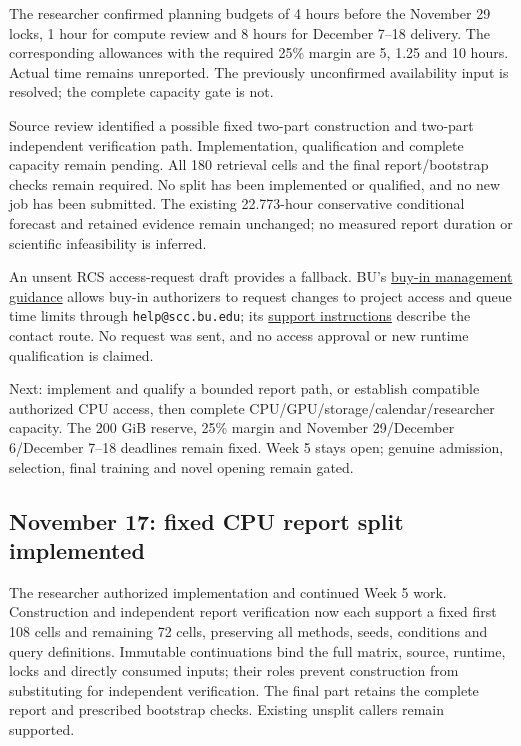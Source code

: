 The researcher confirmed planning budgets of 4 hours before the November 29
locks, 1 hour for compute review and 8 hours for December 7--18 delivery.
The corresponding allowances with the required 25\% margin are 5, 1.25 and
10 hours. Actual time remains unreported. The previously unconfirmed availability
input is resolved; the complete capacity gate is not.

Source review identified a possible fixed two-part construction and two-part
independent verification path. Implementation, qualification and complete
capacity remain pending. All 180 retrieval cells and the final report/bootstrap
checks remain required. No split has been implemented or qualified, and no new
job has been submitted. The existing 22.773-hour conservative conditional
forecast and retained evidence remain unchanged; no measured report duration
or scientific infeasibility is inferred.

An unsent RCS access-request draft provides a fallback. BU's
\href{https://www.bu.edu/tech/support/research/account-management/buy-in-management/}{buy-in management guidance}
allows buy-in authorizers to request changes to project access and queue time
limits through \texttt{help@scc.bu.edu}; its
\href{https://www.bu.edu/tech/support/research/system-usage/support-request/}{support instructions}
describe the contact route. No request was sent, and no access approval or new
runtime qualification is claimed.

Next: implement and qualify a bounded report path, or establish compatible
authorized CPU access, then complete CPU/GPU/storage/calendar/researcher
capacity. The 200 GiB reserve, 25\% margin and November 29/December 6/December
7--18 deadlines remain fixed. Week 5 stays open; genuine admission, selection,
final training and novel opening remain gated.

\subsection*{November 17: fixed CPU report split implemented}

The researcher authorized implementation and continued Week 5 work. Construction
and independent report verification now each support a fixed first 108 cells
and remaining 72 cells, preserving all methods, seeds, conditions and query
definitions. Immutable continuations bind the full matrix, source, runtime,
locks and directly consumed inputs; their roles prevent construction from
substituting for independent verification. The final part retains the complete
report and prescribed bootstrap checks. Existing unsplit callers remain supported.

